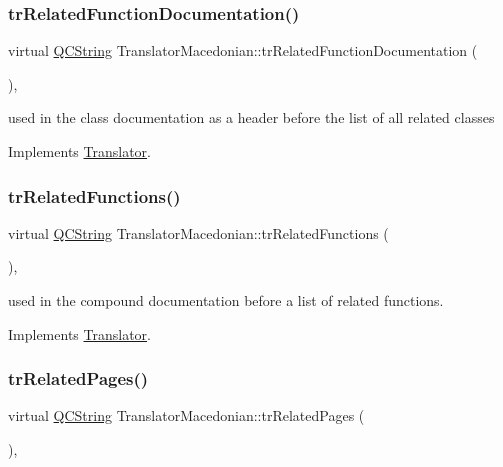 \subsubsection{\texorpdfstring{trRelatedFunctionDocumentation()}{trRelatedFunctionDocumentation()}}
{\footnotesize\ttfamily virtual \mbox{\hyperlink{class_q_c_string}{Q\+C\+String}} Translator\+Macedonian\+::tr\+Related\+Function\+Documentation (\begin{DoxyParamCaption}{ }\end{DoxyParamCaption})\hspace{0.3cm}{\ttfamily [inline]}, {\ttfamily [virtual]}}

used in the class documentation as a header before the list of all related classes 

Implements \mbox{\hyperlink{class_translator}{Translator}}.

\mbox{\label{class_translator_macedonian_a484248af269c2b4f43aaf7515d884204}} 
\subsubsection{\texorpdfstring{trRelatedFunctions()}{trRelatedFunctions()}}
{\footnotesize\ttfamily virtual \mbox{\hyperlink{class_q_c_string}{Q\+C\+String}} Translator\+Macedonian\+::tr\+Related\+Functions (\begin{DoxyParamCaption}{ }\end{DoxyParamCaption})\hspace{0.3cm}{\ttfamily [inline]}, {\ttfamily [virtual]}}

used in the compound documentation before a list of related functions. 

Implements \mbox{\hyperlink{class_translator}{Translator}}.

\mbox{\label{class_translator_macedonian_a3a4b8dd224bbd2c08dff9fd01b8f1123}} 
\subsubsection{\texorpdfstring{trRelatedPages()}{trRelatedPages()}}
{\footnotesize\ttfamily virtual \mbox{\hyperlink{class_q_c_string}{Q\+C\+String}} Translator\+Macedonian\+::tr\+Related\+Pages (\begin{DoxyParamCaption}{ }\end{DoxyParamCaption})\hspace{0.3cm}{\ttfamily [inline]}, {\ttfamily [virtual]}}


